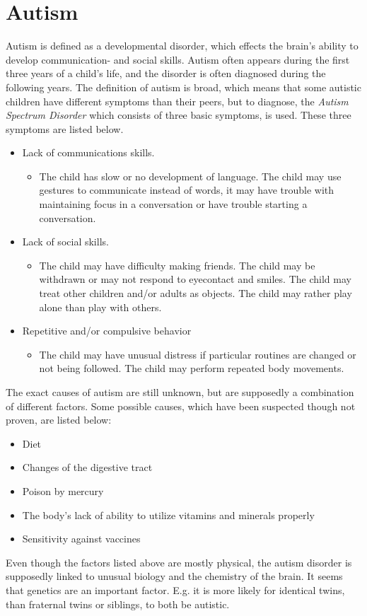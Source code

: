 \section{Autism}
Autism is defined as a developmental disorder, which effects the brain's ability to develop communication- and social skills. Autism often appears during the first three years of a child's life, and the disorder is often diagnosed during the following years.
The definition of autism is broad, which means that some autistic children have different symptoms than their peers, but to diagnose, the \textit{Autism Spectrum Disorder} which consists of three basic symptoms, is used. These three symptoms are listed below.
\begin{itemize}

  \item{Lack of communications skills.}
   \begin{itemize}
     \item{The child has slow or no development of language. The child may use gestures to communicate instead of words, it may have trouble with maintaining focus in a conversation or have trouble starting a conversation.}
   \end{itemize}
   
  \item{Lack of social skills.}
   \begin{itemize}
     \item{The child may have difficulty making friends. The child may be withdrawn or may not respond to eyecontact and smiles. The child may treat other children and/or adults as objects. The child may rather play alone than play with others.}
   \end{itemize}

  \item{Repetitive and/or compulsive behavior}
    \begin{itemize}
      \item{The child may have unusual distress if particular routines are changed or not being followed. The child may perform repeated body movements.}
    \end{itemize}
  
\end{itemize}

The exact causes of autism are still unknown, but are supposedly a combination of different factors. Some possible causes, which have been suspected though not proven, are listed below:

\begin{itemize}
  
  \item{Diet}
  \item{Changes of the digestive tract}
  \item{Poison by mercury}
  \item{The body's lack of ability to utilize vitamins and minerals properly}
  \item{Sensitivity against vaccines}
  
\end{itemize}

Even though the factors listed above are mostly physical, the autism disorder is supposedly linked to unusual biology and the chemistry of the brain.
It seems that genetics are an important factor. E.g. it is more likely for identical twins, than fraternal twins or siblings, to both be autistic.
